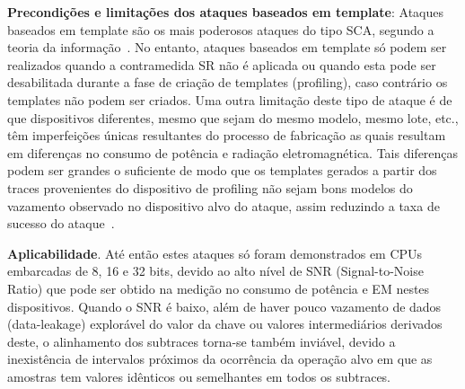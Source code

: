 \noindent \textbf{Precondições e limitações dos ataques baseados em template}: Ataques baseados em template são os mais poderosos ataques do tipo SCA, segundo a teoria da informação~\cite{ChariRaoRohatgi2003}. No entanto, ataques baseados em template só podem ser realizados quando a contramedida SR não é aplicada ou quando esta pode ser desabilitada durante a fase de criação de templates (profiling), caso contrário os templates não podem ser criados. Uma outra limitação deste tipo de ataque é de que dispositivos diferentes, mesmo que sejam do mesmo modelo, mesmo lote, etc., têm imperfeições únicas resultantes do processo de fabricação as quais resultam em diferenças no consumo de potência e radiação eletromagnética. Tais diferenças podem ser grandes o suficiente de modo que os templates gerados a partir dos traces provenientes do dispositivo de profiling não sejam bons modelos do vazamento observado no dispositivo alvo do ataque, assim reduzindo a taxa de sucesso do ataque~\cite{ElaabidGuilley2012}.


\noindent \textbf{Aplicabilidade}. Até então estes ataques só foram demonstrados em CPUs embarcadas de 8, 16 e 32 bits, devido ao alto nível de SNR (Signal-to-Noise Ratio) que pode ser obtido na medição no consumo de potência e EM nestes dispositivos. Quando o SNR é baixo, além de haver pouco vazamento de dados (data-leakage) explorável do valor da chave ou valores intermediários derivados deste, o alinhamento dos subtraces torna-se também inviável, devido a inexistência de intervalos próximos da ocorrência da operação alvo em que as amostras tem valores idênticos ou semelhantes em todos os subtraces.

